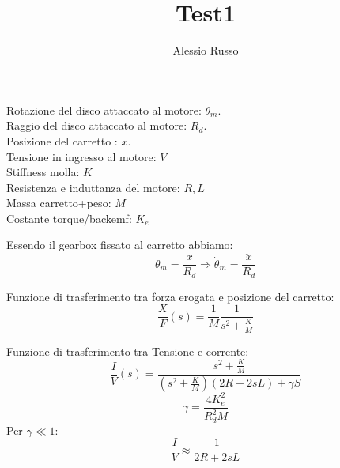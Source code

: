 \documentclass[10pt,a4paper]{book}
\author{Alessio Russo}
\title{Test1}
\begin{document}
Rotazione del disco attaccato al motore: $\theta_m$. \\
Raggio del disco attaccato al motore: $R_d$. \\
Posizione del carretto : $x$. \\
Tensione in ingresso al motore: $V$ \\
Stiffness molla: $K$ \\
Resistenza e induttanza del motore: $R,L$ \\
Massa carretto+peso: $M$ \\
Costante torque/backemf: $K_e$

Essendo il gearbox fissato al carretto abbiamo:
$$\theta_m = \frac{x}{R_d} \Rightarrow \dot{\theta}_m = \frac{\ddot{x}}{R_d}$$

Funzione di trasferimento tra forza erogata e posizione del carretto:
$$\frac{X}{F}(s) = \frac{1}{M} \frac{1}{s^2+\frac{K}{M}}$$

Funzione di trasferimento tra Tensione e corrente:
$$\frac{I}{V}(s) = \frac{s^2+\frac{K}{M}}{(s^2+\frac{K}{M})(2R+2sL)+\gamma S}$$
$$\gamma = \frac{4K_e^2}{R_d^2M}$$
Per $\gamma \ll 1$:
$$\frac{I}{V} \approx \frac{1}{2R+2sL}$$
\end{document}
